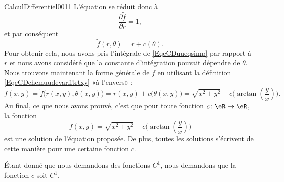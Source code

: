 \begin{corrige}{CalculDifferentiel0011}
	L'équation se réduit donc à
	\begin{equation}		\label{EqeCDuueqsimp}
		\frac{ \partial \tilde f }{ \partial r }=1,
	\end{equation}
	et par conséquent
	\begin{equation}
		\tilde f(r,\theta)=r+c(\theta).
	\end{equation}
	Pour obtenir cela, nous avons pris l'intégrale de \eqref{EqeCDuueqsimp} par rapport à $r$ et nous avons considéré que la constante d'intégration pouvait dépendre de $\theta$. Nous trouvons maintenant la forme générale de $f$ en utilisant la définition \eqref{EqeCDchemuudevarfftrtxy} «à l'envers» :
	\begin{equation}
		f(x,y)=\tilde f\big( r(x,y),\theta(x,y) \big)=r(x,y)+c\big( \theta(x,y) \big)=\sqrt{x^2+y^2}+c\big( \arctan\left( \frac{ y }{ x } \right) \big).
	\end{equation}
	Au final, ce que nous avons prouvé, c'est que pour toute fonction $c\colon \eR\to \eR$, la fonction
	\begin{equation}
		f(x,y)=\sqrt{x^2+y^2}+c\big( \arctan\left( \frac{ y }{ x } \right) \big)
	\end{equation}
	est une solution de l'équation proposée. De plus, toutes les solutions s'écrivent de cette manière pour une certaine fonction $c$.

	Étant donné que nous demandons des fonctions $C^1$, nous demandons que la fonction $c$ soit $C^1$.

\end{corrige}
